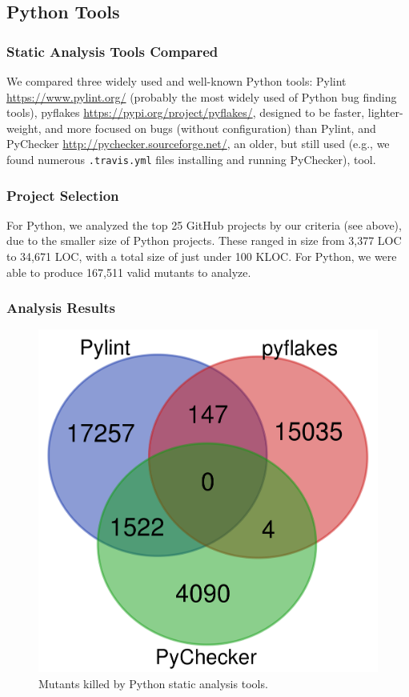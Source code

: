 \subsection{Python Tools}

\subsubsection{Static Analysis Tools Compared}

We compared three widely used and well-known Python tools:  Pylint \url{https://www.pylint.org/} (probably the most widely used of Python bug finding tools), pyflakes \url{https://pypi.org/project/pyflakes/}, designed to be faster, lighter-weight, and more focused on bugs (without configuration) than Pylint, and PyChecker \url{http://pychecker.sourceforge.net/}, an older, but still used (e.g., we found numerous {\tt .travis.yml} files installing and running PyChecker), tool.

\subsubsection{Project Selection}

For Python, we analyzed the top 25 GitHub projects by our criteria (see above), due to the smaller size of Python projects.  These ranged in size from 3,377 LOC to 34,671 LOC, with a total size of just under 100 KLOC.  For Python, we were able to produce 167,511 valid mutants to analyze.

\subsubsection{Analysis Results}


\begin{figure}
  \includegraphics[width=0.6\columnwidth]{python.png}
  \caption{Mutants killed by Python static analysis tools.}
  \label{fig:pythonvenn}
\end{figure}

